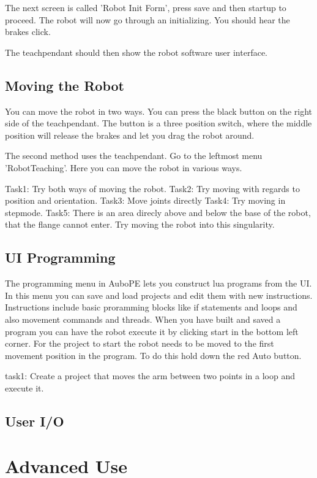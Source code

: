 \documentclass{article}
\begin{document}
The next screen is called 'Robot Init Form', press save and then startup to proceed. The robot will now go through an initializing. You should hear the brakes click.

The teachpendant should then show the robot software user interface.  


\subsection{Moving the Robot}
You can move the robot in two ways. 
You can press the black button on the right side of the teachpendant. The button is a three position switch, where the middle position will release the brakes and let you drag the robot around.

The second method uses the teachpendant. Go to the leftmost menu 'RobotTeaching'. Here you can move the robot in various ways.

Task1: Try both ways of moving the robot. 
Task2: Try moving with regards to position and orientation. 
Task3: Move joints directly
Task4: Try moving in stepmode. 
Task5: There is an area direcly above and below the base of the robot, that the flange cannot enter. Try moving the robot into this singularity. 
  
\subsection{UI Programming} 

The programming menu in AuboPE lets you construct lua programs from the UI. In this menu you can save and load projects and edit them with new instructions. Instructions include basic proramming blocks like if statements and loops and also movement commands and threads. 
When you have built and saved a program you can have the robot execute it by clicking start in the bottom left corner. For the project to start the robot needs to be moved to the first movement position in the program. To do this hold down the red Auto button. 

task1: Create a project that moves the arm between two points in a loop and execute it. 

\subsection{User I/O}

\section{Advanced Use}
\end{document}
